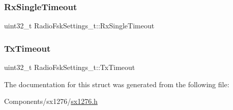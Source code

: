 \subsubsection{\texorpdfstring{Rx\+Single\+Timeout}{RxSingleTimeout}}
{\footnotesize\ttfamily uint32\+\_\+t Radio\+Fsk\+Settings\+\_\+t\+::\+Rx\+Single\+Timeout}

\mbox{\label{structRadioFskSettings__t_a56a8b5f41a508b7a96773141b9bfcd29}} 
\subsubsection{\texorpdfstring{Tx\+Timeout}{TxTimeout}}
{\footnotesize\ttfamily uint32\+\_\+t Radio\+Fsk\+Settings\+\_\+t\+::\+Tx\+Timeout}



The documentation for this struct was generated from the following file\+:\begin{DoxyCompactItemize}
\item 
Components/sx1276/\hyperlink{sx1276_8h}{sx1276.\+h}\end{DoxyCompactItemize}
